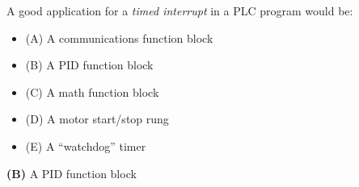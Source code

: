 

A good application for a {\it timed interrupt} in a PLC program would be:

\begin{itemize}
\item{(A)} A communications function block
\vskip 5pt 
\item{(B)} A PID function block
\vskip 5pt 
\item{(C)} A math function block
\vskip 5pt 
\item{(D)} A motor start/stop rung
\vskip 5pt 
\item{(E)} A ``watchdog'' timer
\end{itemize}







{\bf (B)} A PID function block
 










